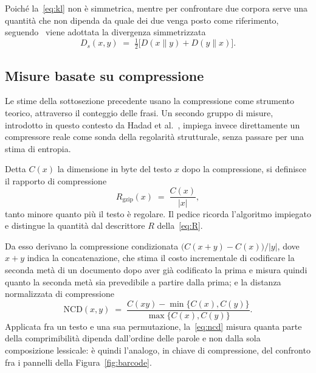 Poiché la~\eqref{eq:kl} non è simmetrica, mentre per confrontare due corpora
serve una quantità che non dipenda da quale dei due venga posto come
riferimento, seguendo~\cite{lippi2019} viene adottata la divergenza
simmetrizzata
\begin{equation}
  D_s(x,y) \;=\; \tfrac{1}{2}\bigl[D(x\|y) + D(y\|x)\bigr].
  \label{eq:kl-sym}
\end{equation}

\subsection{Misure basate su compressione}
\label{sec:compressione}

Le stime della sottosezione precedente usano la compressione come strumento
teorico, attraverso il conteggio delle frasi. Un secondo gruppo di misure,
introdotto in questo contesto da Hadad et al.~\cite{hadad2026}, impiega invece
direttamente un compressore reale come sonda della regolarità strutturale, senza
passare per una stima di entropia.

Detta $C(x)$ la dimensione in byte del testo $x$ dopo la compressione, si
definisce il rapporto di compressione
\begin{equation}
  R_{\mathrm{gzip}}(x) \;=\; \frac{C(x)}{|x|},
  \label{eq:cratio}
\end{equation}
tanto minore quanto più il testo è regolare. Il pedice ricorda l'algoritmo
impiegato e distingue la quantità dal descrittore $R$ della~\eqref{eq:R}.

Da esso derivano la compressione condizionata
$\bigl(C(x+y) - C(x)\bigr)/|y|$, dove $x+y$ indica la concatenazione, che stima
il costo incrementale di codificare la seconda metà di un documento dopo aver
già codificato la prima e misura quindi quanto la seconda metà sia prevedibile
a partire dalla prima; e la distanza normalizzata di compressione~\cite{li2004}
\begin{equation}
  \mathrm{NCD}(x,y) \;=\;
  \frac{C(xy) - \min\{C(x),C(y)\}}{\max\{C(x),C(y)\}} .
  \label{eq:ncd}
\end{equation}
Applicata fra un testo e una sua permutazione, la~\eqref{eq:ncd} misura quanta
parte della comprimibilità dipenda dall'ordine delle parole e non dalla sola
composizione lessicale: è quindi l'analogo, in chiave di compressione, del
confronto fra i pannelli della Figura~\ref{fig:barcode}.


